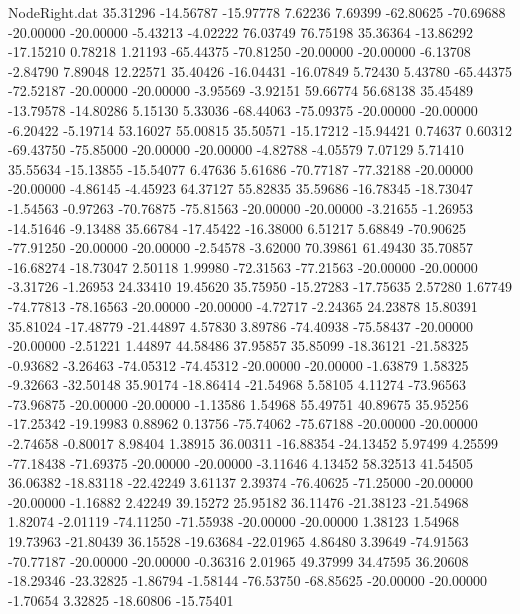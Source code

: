 \begin{filecontents}{NodeRight.dat}
  35.31296  -14.56787  -15.97778     7.62236    7.69399  -62.80625  -70.69688  -20.00000  -20.00000   -5.43213   -4.02222   76.03749   76.75198
  35.36364  -13.86292  -17.15210     0.78218    1.21193  -65.44375  -70.81250  -20.00000  -20.00000   -6.13708   -2.84790    7.89048   12.22571
  35.40426  -16.04431  -16.07849     5.72430    5.43780  -65.44375  -72.52187  -20.00000  -20.00000   -3.95569   -3.92151   59.66774   56.68138
  35.45489  -13.79578  -14.80286     5.15130    5.33036  -68.44063  -75.09375  -20.00000  -20.00000   -6.20422   -5.19714   53.16027   55.00815
  35.50571  -15.17212  -15.94421     0.74637    0.60312  -69.43750  -75.85000  -20.00000  -20.00000   -4.82788   -4.05579    7.07129    5.71410
  35.55634  -15.13855  -15.54077     6.47636    5.61686  -70.77187  -77.32188  -20.00000  -20.00000   -4.86145   -4.45923   64.37127   55.82835
  35.59686  -16.78345  -18.73047    -1.54563   -0.97263  -70.76875  -75.81563  -20.00000  -20.00000   -3.21655   -1.26953  -14.51646   -9.13488
  35.66784  -17.45422  -16.38000     6.51217    5.68849  -70.90625  -77.91250  -20.00000  -20.00000   -2.54578   -3.62000   70.39861   61.49430
  35.70857  -16.68274  -18.73047     2.50118    1.99980  -72.31563  -77.21563  -20.00000  -20.00000   -3.31726   -1.26953   24.33410   19.45620
  35.75950  -15.27283  -17.75635     2.57280    1.67749  -74.77813  -78.16563  -20.00000  -20.00000   -4.72717   -2.24365   24.23878   15.80391
  35.81024  -17.48779  -21.44897     4.57830    3.89786  -74.40938  -75.58437  -20.00000  -20.00000   -2.51221    1.44897   44.58486   37.95857
  35.85099  -18.36121  -21.58325    -0.93682   -3.26463  -74.05312  -74.45312  -20.00000  -20.00000   -1.63879    1.58325   -9.32663  -32.50148
  35.90174  -18.86414  -21.54968     5.58105    4.11274  -73.96563  -73.96875  -20.00000  -20.00000   -1.13586    1.54968   55.49751   40.89675
  35.95256  -17.25342  -19.19983     0.88962    0.13756  -75.74062  -75.67188  -20.00000  -20.00000   -2.74658   -0.80017    8.98404    1.38915
  36.00311  -16.88354  -24.13452     5.97499    4.25599  -77.18438  -71.69375  -20.00000  -20.00000   -3.11646    4.13452   58.32513   41.54505
  36.06382  -18.83118  -22.42249     3.61137    2.39374  -76.40625  -71.25000  -20.00000  -20.00000   -1.16882    2.42249   39.15272   25.95182
  36.11476  -21.38123  -21.54968     1.82074   -2.01119  -74.11250  -71.55938  -20.00000  -20.00000    1.38123    1.54968   19.73963  -21.80439
  36.15528  -19.63684  -22.01965     4.86480    3.39649  -74.91563  -70.77187  -20.00000  -20.00000   -0.36316    2.01965   49.37999   34.47595
  36.20608  -18.29346  -23.32825    -1.86794   -1.58144  -76.53750  -68.85625  -20.00000  -20.00000   -1.70654    3.32825  -18.60806  -15.75401

\end{filecontents}

